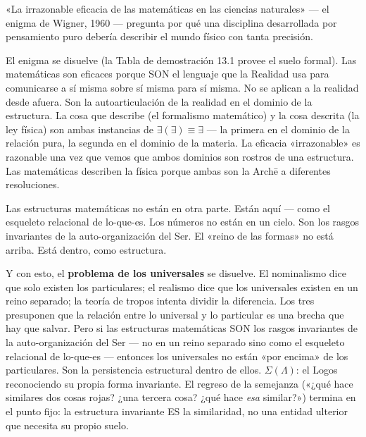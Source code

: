 \documentclass[10pt, openany, oneside]{book}
\begin{document}
\vspace{1em}

\noindent «La irrazonable eficacia de las matemáticas en las ciencias naturales» --- el enigma de Wigner, 1960 --- pregunta por qué una disciplina desarrollada por pensamiento puro debería describir el mundo físico con tanta precisión.

El enigma se disuelve (la Tabla de demostración 13.1 provee el suelo formal). Las matemáticas son eficaces porque SON el lenguaje que la Realidad usa para comunicarse a sí misma sobre sí misma para sí misma. No se aplican a la realidad desde afuera. Son la autoarticulación de la realidad en el dominio de la estructura. La cosa que describe (el formalismo matemático) y la cosa descrita (la ley física) son ambas instancias de $\exists(\exists) \equiv \exists$ --- la primera en el dominio de la relación pura, la segunda en el dominio de la materia. La eficacia «irrazonable» es razonable una vez que vemos que ambos dominios son rostros de una estructura. Las matemáticas describen la física porque ambas son la Arch\={e} a diferentes resoluciones.

Las estructuras matemáticas no están en otra parte. Están aquí --- como el esqueleto relacional de lo-que-es. Los números no están en un cielo. Son los rasgos invariantes de la auto-organización del Ser. El «reino de las formas» no está arriba. Está dentro, como estructura.

Y con esto, el \textbf{problema de los universales} se disuelve. El nominalismo dice que solo existen los particulares; el realismo dice que los universales existen en un reino separado; la teoría de tropos intenta dividir la diferencia. Los tres presuponen que la relación entre lo universal y lo particular es una brecha que hay que salvar. Pero si las estructuras matemáticas SON los rasgos invariantes de la auto-organización del Ser --- no en un reino separado sino como el esqueleto relacional de lo-que-es --- entonces los universales no están «por encima» de los particulares. Son la persistencia estructural dentro de ellos. $\Sigma(\Lambda)$: el Logos reconociendo su propia forma invariante. El regreso de la semejanza («¿qué hace similares dos cosas rojas? ¿una tercera cosa? ¿qué hace \textit{esa} similar?») termina en el punto fijo: la estructura invariante ES la similaridad, no una entidad ulterior que necesita su propio suelo.
\end{document}

